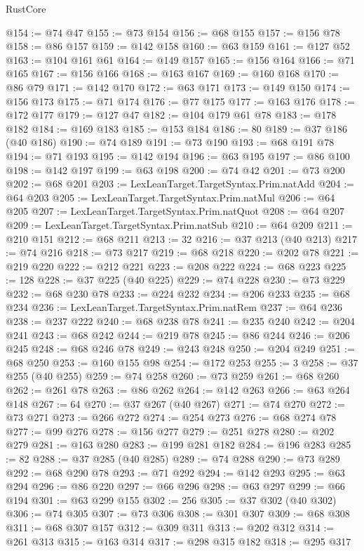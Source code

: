 \begin{lexlean}{RustCore}
\begin{coremodule}
@154 := @74 @47
@155 := @73 @154
@156 := @68 @155
@157 := @156 @78
@158 := @86 @157
@159 := @142 @158
@160 := @63 @159
@161 := @127 @52
@163 := @104 @161 @61
@164 := @149 @157
@165 := @156 @164
@166 := @71 @165
@167 := @156 @166
@168 := @163 @167
@169 := @160 @168
@170 := @86 @79
@171 := @142 @170
@172 := @63 @171
@173 := @149 @150
@174 := @156 @173
@175 := @71 @174
@176 := @77 @175
@177 := @163 @176
@178 := @172 @177
@179 := @127 @47
@182 := @104 @179 @61 @78
@183 := @178 @182
@184 := @169 @183
@185 := @153 @184
@186 := 80
@189 := @37 @186 (@40 @186)
@190 := @74 @189
@191 := @73 @190
@193 := @68 @191 @78
@194 := @71 @193
@195 := @142 @194
@196 := @63 @195
@197 := @86 @100
@198 := @142 @197
@199 := @63 @198
@200 := @74 @42
@201 := @73 @200
@202 := @68 @201
@203 := LexLeanTarget.TargetSyntax.Prim.natAdd
@204 := @64 @203
@205 := LexLeanTarget.TargetSyntax.Prim.natMul
@206 := @64 @205
@207 := LexLeanTarget.TargetSyntax.Prim.natQuot
@208 := @64 @207
@209 := LexLeanTarget.TargetSyntax.Prim.natSub
@210 := @64 @209
@211 := @210 @151
@212 := @68 @211
@213 := 32
@216 := @37 @213 (@40 @213)
@217 := @74 @216
@218 := @73 @217
@219 := @68 @218
@220 := @202 @78
@221 := @219 @220
@222 := @212 @221
@223 := @208 @222
@224 := @68 @223
@225 := 128
@228 := @37 @225 (@40 @225)
@229 := @74 @228
@230 := @73 @229
@232 := @68 @230 @78
@233 := @224 @232
@234 := @206 @233
@235 := @68 @234
@236 := LexLeanTarget.TargetSyntax.Prim.natRem
@237 := @64 @236
@238 := @237 @222
@240 := @68 @238 @78
@241 := @235 @240
@242 := @204 @241
@243 := @68 @242
@244 := @219 @78
@245 := @86 @244
@246 := @206 @245
@248 := @68 @246 @78
@249 := @243 @248
@250 := @204 @249
@251 := @68 @250
@253 := @160 @155 @98
@254 := @172 @253
@255 := 3
@258 := @37 @255 (@40 @255)
@259 := @74 @258
@260 := @73 @259
@261 := @68 @260
@262 := @261 @78
@263 := @86 @262
@264 := @142 @263
@266 := @63 @264 @148
@267 := 64
@270 := @37 @267 (@40 @267)
@271 := @74 @270
@272 := @73 @271
@273 := @266 @272
@274 := @254 @273
@276 := @68 @274 @78
@277 := @99 @276
@278 := @156 @277
@279 := @251 @278
@280 := @202 @279
@281 := @163 @280
@283 := @199 @281 @182
@284 := @196 @283
@285 := 82
@288 := @37 @285 (@40 @285)
@289 := @74 @288
@290 := @73 @289
@292 := @68 @290 @78
@293 := @71 @292
@294 := @142 @293
@295 := @63 @294
@296 := @86 @220
@297 := @66 @296
@298 := @63 @297
@299 := @66 @194
@301 := @63 @299 @155
@302 := 256
@305 := @37 @302 (@40 @302)
@306 := @74 @305
@307 := @73 @306
@308 := @301 @307
@309 := @68 @308
@311 := @68 @307 @157
@312 := @309 @311
@313 := @202 @312
@314 := @261 @313
@315 := @163 @314
@317 := @298 @315 @182
@318 := @295 @317

\end{coremodule}
\end{lexlean}

